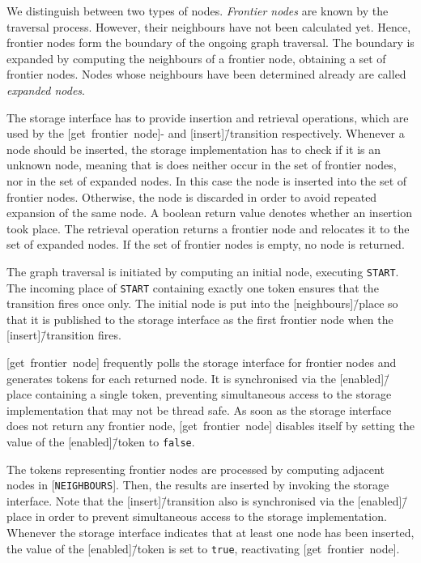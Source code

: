 

We distinguish between two types of nodes. \emph{Frontier nodes} are known by the traversal process. However, their neighbours have not been calculated yet. Hence, frontier nodes form the boundary of the ongoing graph traversal. The boundary is expanded by computing the neighbours of a frontier node, obtaining a set of frontier nodes. Nodes whose neighbours have been determined already are called \emph{expanded nodes}.

The storage interface has to provide insertion and retrieval operations, which are used by the [get~frontier~node]- and [insert]\=/transition respectively. Whenever a node should be inserted, the storage implementation has to check if it is an unknown node, meaning that is does neither occur in the set of frontier nodes, nor in the set of expanded nodes. In this case the node is inserted into the set of frontier nodes. Otherwise, the node is discarded in order to avoid repeated expansion of the same node. A boolean return value denotes whether an insertion took place. The retrieval operation returns a frontier node and relocates it to the set of expanded nodes. If the set of frontier nodes is empty, no node is returned.

The graph traversal is initiated by computing an initial node, executing \texttt{START}. The incoming place of \texttt{START} containing exactly one token ensures that the transition fires once only. The initial node is put into the [neighbours]\=/place so that it is published to the storage interface as the first frontier node when the [insert]\=/transition fires.

[get~frontier~node] frequently polls the storage interface for frontier nodes and generates tokens for each returned node. It is synchronised via the [enabled]\=/place containing a single token, preventing simultaneous access to the storage implementation that may not be thread safe. As soon as the storage interface does not return any frontier node, [get~frontier~node] disables itself by setting the value of the [enabled]\=/token to \texttt{false}.

The tokens representing frontier nodes are processed by computing adjacent nodes in [\texttt{NEIGHBOURS}]. Then, the results are inserted by invoking the storage interface. Note that the [insert]\=/transition also is synchronised via the [enabled]\=/place in order to prevent simultaneous access to the storage implementation. Whenever the storage interface indicates that at least one node has been inserted, the value of the [enabled]\=/token is set to \texttt{true}, reactivating [get~frontier~node].

